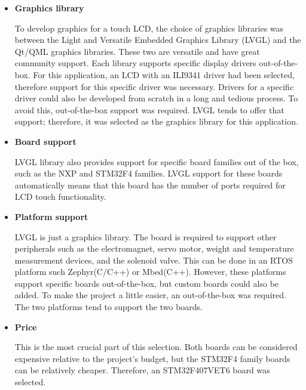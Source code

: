 \begin{itemize}
    \item \textbf{Graphics library} 
    \par
    To develop graphics for a touch LCD, the choice of graphics libraries was between the Light and Versatile Embedded Graphics Library (LVGL) and the Qt/QML graphics libraries. These two are versatile and have great community support. Each library supports specific display drivers out-of-the-box. For this application, an LCD with an ILI9341 driver had been selected, therefore support for this specific driver was necessary. Drivers for a specific driver could also be developed from scratch in a long and tedious process. To avoid this, out-of-the-box support was required. LVGL tends to offer that support; therefore, it was selected as the graphics library for this application.
    \item \textbf{Board support} 
    \par
    LVGL library also provides support for specific board families out of the box, such as the NXP and STM32F4 families. LVGL support for these boards automatically means that this board has the number of ports required for LCD touch functionality.
    \item \textbf{Platform support}
    \par
    LVGL is just a graphics library. The board is required to support other peripherals such as the electromagnet, servo motor, weight and temperature measurement devices, and the solenoid valve. This can be done in an RTOS platform such Zephyr(C/C++) or Mbed(C++). However, these platforms support specific boards out-of-the-box, but custom boards could also be added. To make the project a little easier, an out-of-the-box was required. The two platforms tend to support the two boards. 
    \item \textbf{Price}
    \par
    This is the most crucial part of this selection. Both boards can be considered expensive relative to the project's budget, but the STM32F4 family boards can be relatively cheaper. Therefore, an STM32F407VET6 board was selected.
\end{itemize}

